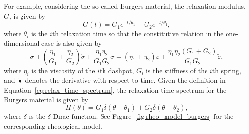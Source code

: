 For example, considering the so-called Burgers material, the relaxation modulus, $G$, is given by \citep{malkinRheologyConceptsMethods2017}
\begin{equation}
\label{eq:relaxation_modulus_burgers}
  G(t)=G_{1} e^{-t / \theta_{1}} + G_2 e^{-t/\theta_2},
\end{equation}
where $\theta_i$ is the $i$th relaxation time so that the constitutive relation in the one-dimensional case is also given by
\begin{equation}
  \sigma + \left(\frac{\eta_1}{G_1} + \frac{\eta_2}{G_2}\right) \dot \sigma + \frac{\eta_1\eta_2}{G_1G_2}\ddot \sigma = (\eta_1 + \eta_2)\dot\varepsilon + \frac{\eta_1\eta_2(G_1 + G_2)}{G_1G_2}\ddot\varepsilon,
\end{equation}
where $\eta_i$ is the viscosity of the $i$th dashpot, $G_i$ is the stiffness of the $i$th spring, and $\dot{\bullet}$ denotes the derivative with respect to time.
Given the definition in Equation~\eqref{eq:relax_time_spectrum}, the relaxation time spectrum for the Burgers material is given by
\begin{equation}
  H(\theta) = G_1 \delta(\theta - \theta_1) + G_2 \delta(\theta - \theta_2),
\end{equation}
where $\delta$ is the $\delta$-Dirac function.
See Figure~\ref{fig:rheo_model_burgers} for the corresponding rheological model.

